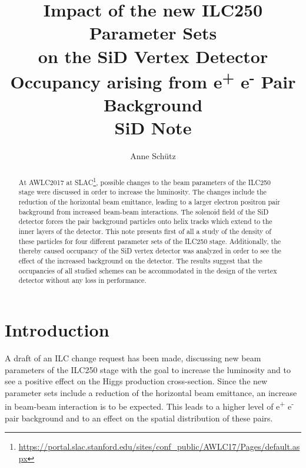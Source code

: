 \documentclass[12pt]{article}
\newcommand{\sid}{SiD\xspace}
\newcommand{\electron}{e\textsuperscript{-}\xspace}
\newcommand{\positron}{e\textsuperscript{+}\xspace}
\begin{document}

\title{Impact of the new ILC250 Parameter Sets\\on the \sid Vertex Detector Occupancy arising from \positron\electron Pair Background\vspace*{0.3cm}\\{\normalsize \sid Note}}

\author[1,2]{Anne Sch\"utz}


\maketitle


\begin{abstract}
At AWLC2017 at SLAC\footnote{\url{https://portal.slac.stanford.edu/sites/conf_public/AWLC17/Pages/default.aspx}}, possible changes to the beam parameters of the ILC250 stage were discussed in order to increase the luminosity.
The changes include the reduction of the horizontal beam emittance, leading to a larger electron positron pair background from increased beam-beam interactions.
The solenoid field of the SiD detector forces the pair background particles onto helix tracks which extend to the inner layers of the detector.
This note presents first of all a study of the density of these particles for four different parameter sets of the ILC250 stage.
Additionally, the thereby caused occupancy of the SiD vertex detector was analyzed in order to see the effect of the increased background on the detector.  
The results suggest that the occupancies of all studied schemes can be accommodated in the design of the vertex detector without any loss in performance.
\end{abstract}


\section{Introduction}
\label{sec:introduction}
A draft of an ILC change request has been made, discussing new beam parameters of the ILC250 stage with the goal to increase the luminosity and to see a positive effect on the Higgs production cross-section.
Since the new parameter sets include a reduction of the horizontal beam emittance, an increase in beam-beam interaction is to be expected.
This leads to a higher level of \positron\electron pair background and to an effect on the spatial distribution of these pairs.
\end{document}

